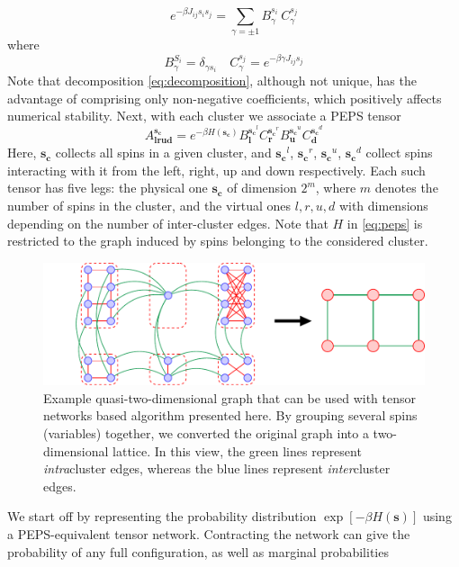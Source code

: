 \begin{equation}
    e^{-\beta J_{ij}s_i s_j} = \sum_{\gamma = \pm 1} B^{s_{i\phantom{j}}}_\gamma C^{s_j}_\gamma
\end{equation}
where 
\begin{equation}
\label{eq:decomposition}
    B^{S_i}_\gamma = \delta_{\gamma s_i} \quad C^{s_j}_\gamma = e^{-\beta \gamma J_{ij} s_j}
\end{equation}
Note that decomposition \eqref{eq:decomposition}, although not unique, has the advantage of comprising only non-negative coefficients, which positively affects numerical stability.
Next, with each cluster we associate a PEPS tensor
\begin{equation}
\label{eq:peps}
A^{\mathbf{s_c}}_{\mathbf{lrud}} = e^{-\beta H(\mathbf{s_c})} B^{\mathbf{s_c}^l}_\mathbf{l}C^{\mathbf{s_c}^r}_\mathbf{r}B^{\mathbf{s_c}^u}_\mathbf{u}C^{\mathbf{s_c}^d}_\mathbf{d}
\end{equation}
Here, $\mathbf{s_c}$ collects all spins in a given cluster, and $\mathbf{s_c}^l$, $\mathbf{s_c}^r$, $\mathbf{s_c}^u$, $\mathbf{s_c}^d$ collect spins interacting with it from the left, right, up and down respectively. Each such tensor has five legs: the physical one $\mathbf{s_c}$ of dimension $2^m$, where $m$ denotes the number of spins in the cluster, and the virtual ones $l, r, u, d$ with dimensions depending on the number of inter-cluster edges. Note that $H$ in \eqref{eq:peps} is restricted to the graph induced by spins belonging to the considered cluster.

\begin{figure}
    \centering
    \includegraphics[width=\textwidth]{figures/clustering.pdf}
    \caption{Example quasi-two-dimensional graph that can be used with tensor networks based algorithm presented here. By grouping several spins (variables) together, we converted the original graph into a two-dimensional lattice. In this view, the green lines represent \emph{intra}cluster edges, whereas the blue lines represent \emph{inter}cluster edges.}
    \label{fig:quasi2d}
\end{figure}
We start off by representing the probability distribution $\exp[-\beta H(\mathbf{s})]$ using a PEPS-equivalent tensor network.
Contracting the network can give the probability of any full configuration, as well as marginal probabilities

